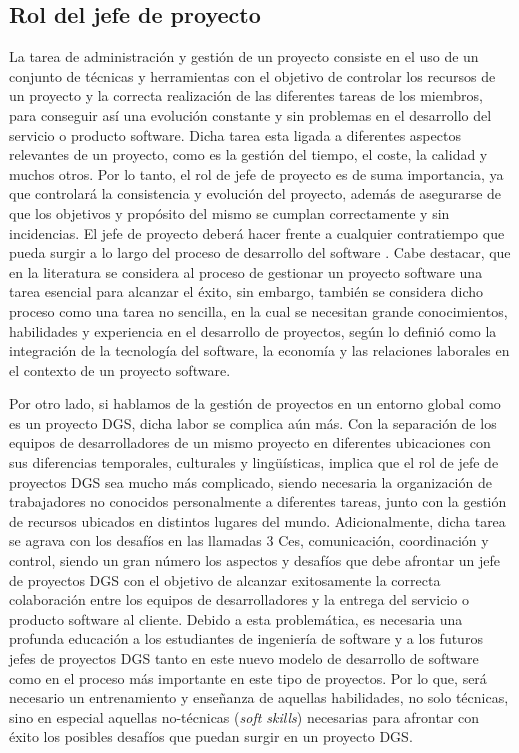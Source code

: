 \subsection{Rol del jefe de proyecto}
\label{sec:ImportanciaJP}

La tarea de administración y gestión de un proyecto consiste en el uso de un conjunto de técnicas y herramientas con el objetivo de controlar los recursos de un proyecto y la correcta realización de las diferentes tareas de los miembros, para conseguir así una evolución constante y sin problemas en el desarrollo del servicio o producto software. Dicha tarea esta ligada a diferentes aspectos relevantes de un proyecto, como es la gestión del tiempo, el coste, la calidad y muchos otros. Por lo tanto, el rol de jefe de proyecto es de suma importancia, ya que controlará la consistencia y evolución del proyecto, además de asegurarse de que los objetivos y propósito del mismo se cumplan correctamente y sin incidencias. El jefe de proyecto deberá hacer frente a cualquier contratiempo que pueda surgir a lo largo del proceso de desarrollo del software \cite{colomo2014project}. Cabe destacar, que en la literatura se considera al proceso de gestionar un proyecto software una tarea esencial para alcanzar el éxito, sin embargo, también se considera dicho proceso como una tarea no sencilla, en la cual se necesitan grande conocimientos, habilidades y experiencia en el desarrollo de proyectos, según \cite{boehm1989theory} lo definió como la integración de la tecnología del software, la economía y las relaciones laborales en el contexto de un proyecto software. 

Por otro lado, si hablamos de la gestión de proyectos en un entorno global como es un proyecto DGS, dicha labor se complica aún más. Con la separación de los equipos de desarrolladores de un mismo proyecto en diferentes ubicaciones con sus diferencias temporales, culturales y lingüísticas, implica que el rol de jefe de proyectos DGS sea mucho más complicado, siendo necesaria la organización de trabajadores no conocidos personalmente a diferentes tareas, junto con la gestión de recursos ubicados en distintos lugares del mundo. Adicionalmente, dicha tarea se agrava con los desafíos en las llamadas 3 Ces, comunicación, coordinación y control, siendo un gran número los aspectos y desafíos que debe afrontar un jefe de proyectos DGS con el objetivo de alcanzar exitosamente la correcta colaboración entre los equipos de desarrolladores y la entrega del servicio o producto software al cliente. Debido a esta problemática, es necesaria una profunda educación a los estudiantes de ingeniería de software y a los futuros jefes de proyectos DGS tanto en este nuevo modelo de desarrollo de software como en el proceso más importante en este tipo de proyectos. Por lo que, será necesario un entrenamiento y enseñanza de aquellas habilidades, no solo técnicas, sino en especial aquellas no-técnicas (\emph{soft skills}) necesarias para afrontar con éxito los posibles desafíos que puedan surgir en un proyecto DGS.

